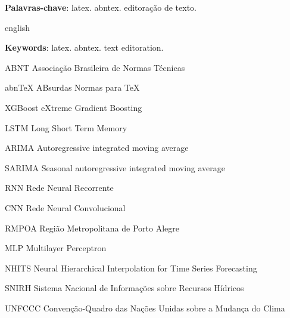 \documentclass[
	12pt,				%
	openright,			%
	twoside,			%
	a4paper,			%
	english,			%
	french,				%
	spanish,			%
	brazil				%
	]{abntex2}
\newcommand{\listofquadrosname}{Lista de quadros}
\begin{document}
\begin{agradecimentos}
\lipsum[1]

\end{agradecimentos}


\setlength{\absparsep}{18pt} %
\begin{resumo}
\lipsum[1]

 \textbf{Palavras-chave}: latex. abntex. editoração de texto.
\end{resumo}

\begin{resumo}[Abstract]
 \begin{otherlanguage*}{english}
\lipsum[1]

   \vspace{\onelineskip}
 
   \noindent 
   \textbf{Keywords}: latex. abntex. text editoration.
 \end{otherlanguage*}
\end{resumo}




\begin{siglas}
  \item[ABNT] Associação Brasileira de Normas Técnicas
  \item[abnTeX] ABsurdas Normas para TeX
  \item[XGBoost] eXtreme Gradient Boosting
  \item[LSTM] Long Short Term Memory
  \item[ARIMA] Autoregressive integrated moving average
  \item[SARIMA] Seasonal autoregressive integrated moving average
  \item[RNN] Rede Neural Recorrente
  \item[CNN] Rede Neural Convolucional  
  \item[RMPOA] Região Metropolitana de Porto Alegre 
  \item [MLP] Multilayer Perceptron
  \item [NHITS] Neural Hierarchical Interpolation for Time Series Forecasting
  \item [SNIRH] Sistema Nacional de Informações sobre Recursos Hídricos
  \item [UNFCCC] Convenção-Quadro das Nações Unidas sobre a Mudança do Clima
\end{siglas}
\end{document}

